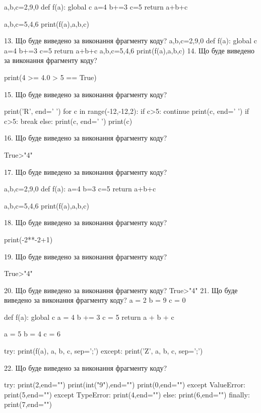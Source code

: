 \documentclass[11pt]{article}
\begin{document}
a,b,c=2,9,0
def f(a):
global c    a=4
    b+=3
    c=5
    return a+b+c

a,b,c=5,4,6
print(f(a),a,b,c)

13. Що буде виведено за виконання фрагменту коду?
a,b,c=2,9,0
   def f(a):
     global c     a=4
     b+=3
     c=5
     return a+b+c
   a,b,c=5,4,6
   print(f(a),a,b,c)
14. Що буде виведено за виконання фрагменту коду?

print(4 >= 4.0 > 5 == True)

15. Що буде виведено за виконання фрагменту коду?

print('R', end=' ')
for c in range(-12,-12,2):
    if c>5:
        continue
        print(c, end=' ')
    if c>5:
        break
    else:
        print(c, end=' ')
    print(c)

16. Що буде виведено за виконання фрагменту коду?

True>"4"

17. Що буде виведено за виконання фрагменту коду?

a,b,c=2,9,0
def f(a):
    a=4
    b=3
    c=5
    return a+b+c

a,b,c=5,4,6
print(f(a),a,b,c)

18. Що буде виведено за виконання фрагменту коду?

print(-2**-2+1)

19. Що буде виведено за виконання фрагменту коду?

True>"4"

20. Що буде виведено за виконання фрагменту коду?
True>"4"
21. Що буде виведено за виконання фрагменту коду?
a = 2
b = 9
c = 0

def f(a):
global c    a = 4
    b += 3
    c = 5
    return a + b + c

a = 5
b = 4
c = 6

try:
    print(f(a), a, b, c, sep=';')
except:
    print('Z', a, b, c, sep=';')

22. Що буде виведено за виконання фрагменту коду?

try:
    print(2,end="")
    print(int("9"),end="")
    print(0,end="")
except ValueError: print(5,end="")
except TypeError: print(4,end="")
else: print(6,end="")
finally: print(7,end="")

\end{document}
